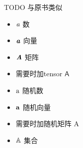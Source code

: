 TODO
与原书类似
\begin{itemize}
 \item $\mathit{a}$ 数
 \item $\boldsymbol{\mathit{a}}$ 向量
 \item $\boldsymbol{\mathit{A}}$ 矩阵
 \item 需要时加tensor $\boldsymbol{\mathsf{A}}$
 \item $\mathrm{a}$ 随机数
 \item $\mathbf{a}$ 随机向量
 \item 需要时加随机矩阵 $\boldsymbol{\mathrm{A}}$
 \item $\mathbb{A}$ 集合
\end{itemize} 

